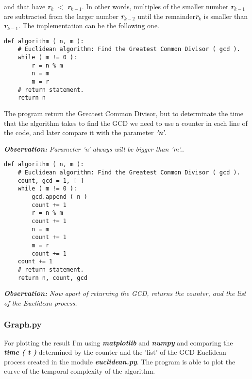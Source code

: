 \documentclass[10pt,a4paper]{article}
\begin{document}
and that have {\bfseries\itshape r$_{k}$} $<$ {\bfseries\itshape r$_{k-1}$}. In other words, multiples of the smaller number {\bfseries\itshape r$_{k-1}$} are subtracted from the larger number {\bfseries\itshape r$_{k-2}$} until the remainder{\bfseries\itshape r$_{k}$} is smaller than {\bfseries\itshape r$_{k-1}$}. The implementation can be the following one. \hfill \break

\begin{lstlisting}
def algorithm ( n, m ):
    # Euclidean algorithm: Find the Greatest Common Divisor ( gcd ).
    while ( m != 0 ):
        r = n % m
        n = m
        m = r
    # return statement.
    return n
\end{lstlisting} \hfill 

The program return the Greatest Common Divisor, but to determinate the time that the algorithm takes to find the GCD we need to use a counter in each line of the code, and later compare it with the parameter {\bfseries\itshape 'n'}. \hfill \break

{\bfseries\itshape Observation:} {\itshape Parameter 'n' always will be bigger than 'm'.}. \hfill \break

\begin{lstlisting}
def algorithm ( n, m ):
    # Euclidean algorithm: Find the Greatest Common Divisor ( gcd ).
    count, gcd = 1, [ ]
    while ( m != 0 ):
        gcd.append ( n )
        count += 1
        r = n % m
        count += 1
        n = m
        count += 1
        m = r
        count += 1
    count += 1
    # return statement.
    return n, count, gcd
\end{lstlisting} \hfill 

{\bfseries\itshape Observation:} {\itshape Now apart of returning the GCD, returns the counter, and the list of the Euclidean process.}

\pagebreak

\subsubsection{Graph.py}
 
For plotting the result I'm using {\bfseries\itshape matplotlib} and {\bfseries\itshape numpy} and comparing the {\bfseries\itshape time ( t )} determined by the counter and the 'list' of the GCD Euclidean process created in the module {\bfseries\itshape euclidean.py}. The program is able to plot the curve of the temporal complexity of the algorithm. \hfill \break
\end{document}
